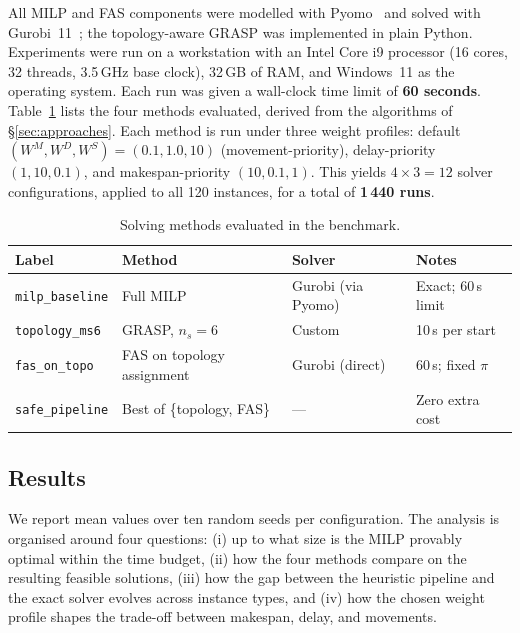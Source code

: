 All MILP and FAS components were modelled with Pyomo~\citep{Bynum2021}
and solved with Gurobi~11~\citep{Gurobi2023}; the topology-aware GRASP
was implemented in plain Python.  Experiments were run on a workstation
with an Intel Core i9 processor (16 cores, 32 threads, 3.5\,GHz base
clock), 32\,GB of RAM, and Windows~11 as the operating system.  Each run
was given a wall-clock time limit of \textbf{60 seconds}.
Table~\ref{tab:methods} lists the four methods evaluated, derived from
the algorithms of \S\ref{sec:approaches}.
Each method is run under three weight profiles:
default $(W^M, W^D, W^S) = (0.1, 1.0, 10)$ (movement-priority),
delay-priority $(1, 10, 0.1)$, and makespan-priority $(10, 0.1, 1)$.
This yields $4 \times 3 = 12$ solver configurations, applied to all 120
instances, for a total of \textbf{1\,440 runs}.

\begin{table}[htbp]
  \centering
  \caption{Solving methods evaluated in the benchmark.}
  \label{tab:methods}
  \begin{tabular}{llll}
    \toprule
    Label & Method & Solver & Notes \\
    \midrule
    \texttt{milp\_baseline}
      & Full MILP
      & Gurobi (via Pyomo)
      & Exact; 60\,s limit \\
    \texttt{topology\_ms6}
      & GRASP, $n_s{=}6$
      & Custom
      & 10\,s per start \\
    \texttt{fas\_on\_topo}
      & FAS on topology assignment
      & Gurobi (direct)
      & 60\,s; fixed $\pi$ \\
    \texttt{safe\_pipeline}
      & Best of \{topology, FAS\}
      & ---
      & Zero extra cost \\
    \bottomrule
  \end{tabular}
\end{table}

\subsection{Results}
\label{sec:results}

We report mean values over ten random seeds per configuration.
The analysis is organised around four questions: (i) up to what size is the MILP
provably optimal within the time budget, (ii) how the four methods compare on
the resulting feasible solutions, (iii) how the gap between the heuristic
pipeline and the exact solver evolves across instance types, and
(iv) how the chosen weight profile shapes the trade-off between makespan,
delay, and movements.

